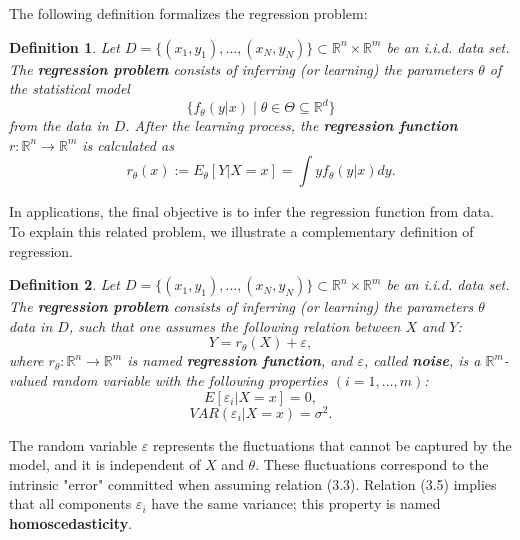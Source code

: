 \documentclass{report}
\newtheorem{definition}{Definition}[chapter]
\begin{document}
The following definition formalizes the regression problem:

\begin{definition}
Let $D = \{(x_1,y_1),\dots,(x_N,y_N)\} \subset \mathbb{R}^n \times \mathbb{R}^m$ be an i.i.d. data set. The \textbf{regression problem} consists of inferring (or learning) the parameters $\theta$ of the statistical model
\begin{equation}
\{f_\theta(y|x) \mid \theta \in \Theta \subseteq \mathbb{R}^d\}
\end{equation}
from the data in $D$. After the learning process, the \textbf{regression function} $r : \mathbb{R}^n \to \mathbb{R}^m$ is calculated as
\begin{equation}
 r_\theta(x) := E_\theta[Y|X = x] = \int yf_\theta(y|x)dy.
\end{equation}
\end{definition}

In applications, the final objective is to infer the regression function from data. To explain this related problem, we illustrate a complementary definition of regression.

\begin{definition}
Let $D = \{(x_1,y_1),\dots,(x_N,y_N)\} \subset \mathbb{R}^n \times \mathbb{R}^m$ be an i.i.d. data set. The \textbf{regression problem} consists of inferring (or learning) the parameters $\theta$ data in $D$, such that one assumes the following relation between $X$ and $Y$:
\begin{equation}
Y = r_\theta(X) + \varepsilon,
\end{equation}
where $r_\theta : \mathbb{R}^n \to \mathbb{R}^m$ is named \textbf{regression function}, and $\varepsilon$, called \textbf{noise}, is a $\mathbb{R}^m$-valued random variable with the following properties $(i = 1,\dots,m)$:
\begin{equation}
E[\varepsilon_i|X = x] = 0,
\end{equation}
\begin{equation}
VAR(\varepsilon_i|X = x) = \sigma^2.
\end{equation}
\end{definition}

The random variable $\varepsilon$ represents the fluctuations that cannot be captured by the model, and it is independent of $X$ and $\theta$. These fluctuations correspond to the intrinsic "error" committed when assuming relation (3.3). Relation (3.5) implies that all components $\varepsilon_i$ have the same variance; this property is named \textbf{homoscedasticity}.
\end{document}
